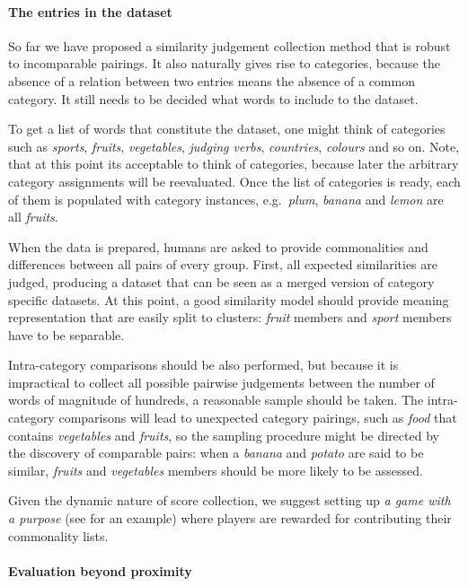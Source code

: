 \documentclass[11pt]{article}
\begin{document}
\paragraph{The entries in the dataset}

So far we have proposed a similarity judgement collection method that is robust to incomparable pairings. It also naturally gives rise to categories, because the absence of a relation between two entries means the absence of a common category. It still needs to be decided what words to include to the dataset.

To get a list of words that constitute the dataset, one might think of categories such as \textit{sports}, \textit{fruits}, \textit{vegetables}, \textit{judging verbs}, \textit{countries}, \textit{colours} and so on. Note, that at this point its acceptable to think of categories, because later the arbitrary category assignments will be reevaluated. Once the list of categories is ready, each of them is populated with category instances, e.g.~\textit{plum}, \textit{banana} and \textit{lemon} are all \textit{fruits}.

When the data is prepared, humans are asked to provide commonalities and differences between all pairs of every group. First, all expected similarities are judged, producing a dataset that can be seen as a merged version of category specific datasets. At this point, a good similarity model should provide meaning representation that are easily split to clusters: \textit{fruit} members and \textit{sport} members have to be separable.

Intra-category comparisons should be also performed, but because it is impractical to collect all possible pairwise judgements between the number of words of magnitude of hundreds, a reasonable sample should be taken. The intra-category comparisons will lead to unexpected category pairings, such as \textit{food} that contains \textit{vegetables} and \textit{fruits}, so the sampling procedure might be directed by the discovery of comparable pairs: when a \textit{banana} and \textit{potato} are said to be similar, \textit{fruits} and \textit{vegetables} members should be more likely to be assessed.

Given the dynamic nature of score collection, we suggest setting up \emph{a game with a purpose} (see  for an example) where players are rewarded for contributing their commonality lists.

\paragraph{Evaluation beyond proximity}
\end{document}
